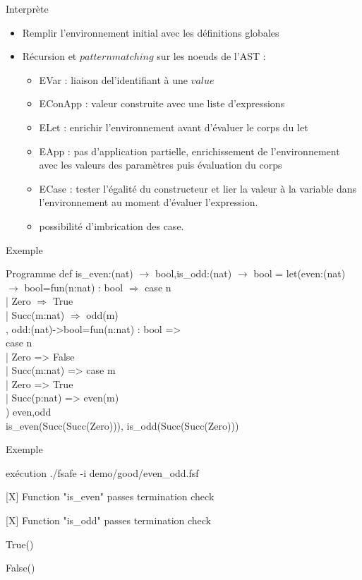 \begin{frame}{Interprète}
  \begin{itemize}
  \item Remplir l'environnement initial avec les définitions globales
  \item Récursion et $pattern matching$ sur les noeuds de l'AST :
    \begin{itemize}
    \item EVar : liaison del'identifiant à une $value$
    \item EConApp : valeur construite avec une liste d'expressions
    \item ELet : enrichir l'environnement avant d'évaluer le corps du let
    \item EApp : pas d'application partielle, enrichissement de l'environnement avec les valeurs des paramètres puis évaluation du corps
    \item ECase : tester l'\'egalit\'e du constructeur et lier la valeur \`a la variable dans l'environnement au moment d'évaluer l'expression.
    \item possibilit\'e d'imbrication des case.
    \end{itemize}
  \end{itemize}
\end{frame}

\begin{frame}{Exemple}
  \begin{exampleblock}{Programme}
    def is\_even:(nat) $\rightarrow$ bool,is\_odd:(nat) $\rightarrow$ bool =
    let(even:(nat) $\rightarrow$ bool=fun(n:nat) : bool $\Rightarrow$
    case n {\\
      | Zero $\Rightarrow$ True\\
      | Succ(m:nat) $\Rightarrow$ odd(m)\\
    },
    odd:(nat)->bool=fun(n:nat) : bool =>\\
    case n {\\
      | Zero => False\\
      | Succ(m:nat) => case m {\\
        | Zero => True\\
        | Succ(p:nat) => even(m)}\\
    }) { even,odd }\\
    
    is\_even(Succ(Succ(Zero))),
    is\_odd(Succ(Succ(Zero)))
  \end{exampleblock}
\end{frame}

\begin{frame}{Exemple}
\begin{exampleblock}{exécution}
    ./fsafe -i demo/good/even\_odd.fsf 
    
    [X] Function "is\_even" passes termination check
    
    [X] Function "is\_odd" passes termination  check
    
    True()
    
    False()
  \end{exampleblock}
\end{frame}